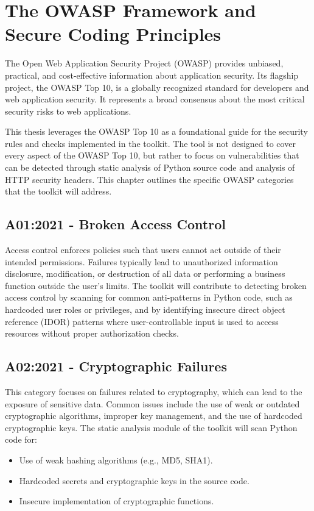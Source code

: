 \chapter{The OWASP Framework and Secure Coding Principles}
\label{chap:owasp}
\setlength{\parskip}{1em}

The Open Web Application Security Project (OWASP) provides unbiased, practical, and cost-effective information about application security. Its flagship project, the OWASP Top 10, is a globally recognized standard for developers and web application security. It represents a broad consensus about the most critical security risks to web applications.

This thesis leverages the OWASP Top 10 as a foundational guide for the security rules and checks implemented in the toolkit. The tool is not designed to cover every aspect of the OWASP Top 10, but rather to focus on vulnerabilities that can be detected through static analysis of Python source code and analysis of HTTP security headers. This chapter outlines the specific OWASP categories that the toolkit will address.

\section{A01:2021 - Broken Access Control}
Access control enforces policies such that users cannot act outside of their intended permissions. Failures typically lead to unauthorized information disclosure, modification, or destruction of all data or performing a business function outside the user's limits. 
The toolkit will contribute to detecting broken access control by scanning for common anti-patterns in Python code, such as hardcoded user roles or privileges, and by identifying insecure direct object reference (IDOR) patterns where user-controllable input is used to access resources without proper authorization checks.

\section{A02:2021 - Cryptographic Failures}
This category focuses on failures related to cryptography, which can lead to the exposure of sensitive data. Common issues include the use of weak or outdated cryptographic algorithms, improper key management, and the use of hardcoded cryptographic keys.
The static analysis module of the toolkit will scan Python code for:
\begin{itemize}
    \item Use of weak hashing algorithms (e.g., MD5, SHA1).
    \item Hardcoded secrets and cryptographic keys in the source code.
    \item Insecure implementation of cryptographic functions.
\end{itemize}

